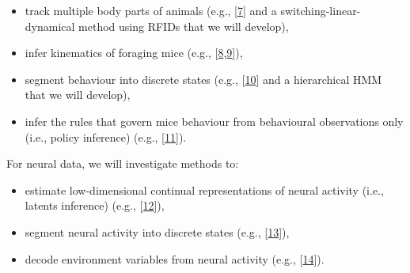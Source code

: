 \begin{itemize}

    \item track multiple body parts of animals (e.g.,
        [\href{https://pubmed.ncbi.nlm.nih.gov/30127430/}{7}] and a
        switching-linear-dynamical method using RFIDs that we will develop),

    \item infer kinematics of foraging mice (e.g.,
        [\href{https://github.com/joacorapela/lds\_python}{8},\href{https://www.cambridge.org/core/books/fundamentals-of-object-tracking/A543B0EA12957B353BE4B5D0602EE945}{9}]),

    \item segment behaviour into discrete states (e.g.,
        [\href{https://pubmed.ncbi.nlm.nih.gov/26687221/}{10}]
        and a hierarchical HMM that we will develop),

    \item infer the rules that govern mice behaviour from behavioural
        observations only (i.e., policy inference) (e.g.,
        [\href{https://arxiv.org/abs/2311.13870v2}{11}]).

\end{itemize}

For neural data, we will investigate methods to:

\begin{itemize}

    \item estimate low-dimensional continual representations of neural activity
        (i.e., latents inference) (e.g.,
        [\href{https://papers.nips.cc/paper_files/paper/2011/hash/7143d7fbadfa4693b9eec507d9d37443-Abstract.html}{12}]),

    \item segment neural activity into discrete states (e.g.,
        [\href{https://pubmed.ncbi.nlm.nih.gov/21299424/}{13}]),

    \item decode environment variables from neural activity (e.g.,
        [\href{https://pubmed.ncbi.nlm.nih.gov/25973549/}{14}]).

\end{itemize}
